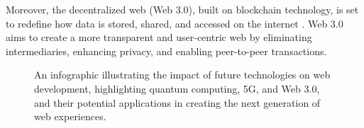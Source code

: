 Moreover, the decentralized web (Web 3.0), built on blockchain technology, is set to redefine how data is stored, shared, and accessed on the internet \cite{white2021web3}. Web 3.0 aims to create a more transparent and user-centric web by eliminating intermediaries, enhancing privacy, and enabling peer-to-peer transactions.

\begin{figure}[h]
    \centering
    \caption{An infographic illustrating the impact of future technologies on web development, highlighting quantum computing, 5G, and Web 3.0, and their potential applications in creating the next generation of web experiences.}
    \label{fig:future_technologies_infographic}
\end{figure}

